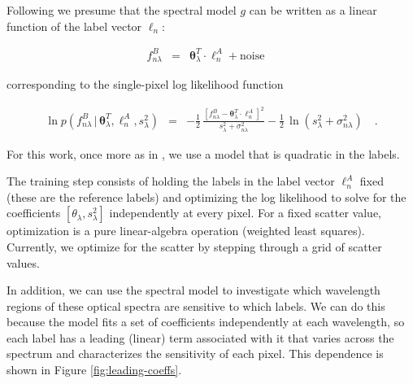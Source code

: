 \documentclass[12pt, preprint]{aastex}
\newcommand{\set}[1]{\bm{#1}}
\newcommand{\starlabel}{\ell}
\newcommand{\starlabelvec}{\set{\starlabel}}
\newcommand{\given}{\,|\,}
\begin{document}
Following \citet{Ness2015} we presume that the spectral model $g$ 
can be written as a linear function of the label vector $\starlabelvec_n$: 

\begin{eqnarray}
f_{n\lambda}^B &=&
\set{\theta}_\lambda^T \cdot \starlabelvec^A_n + \mbox{noise}
\label{eq:linearmodel}\quad
\end{eqnarray}

\noindent corresponding to the single-pixel log likelihood function

\begin{eqnarray}
\ln p(f_{n\lambda}^B\given\set{\theta}^T_\lambda, \starlabelvec^A_n, s_\lambda^2) &=&
 -\frac{1}{2}\,\frac{[f_{n\lambda}^B - \set{\theta}^T_\lambda \cdot \starlabelvec^A_n]^2}{s_\lambda^2 + \sigma_{n\lambda}^2}
 -\frac{1}{2}\,\ln(s_\lambda^2 + \sigma_{n\lambda}^2)
\label{eq:like}\quad.
\end{eqnarray}

\noindent For this work, once more as in \citet{Ness2015}, 
we use a model that is quadratic in the labels. 

The training step consists of holding the labels in the label vector 
$\starlabelvec^A_n$ fixed (these are the reference labels) 
and optimizing the log likelihood to solve for the coefficients 
$[\theta_\lambda, s_\lambda^2]$ independently at every pixel. 
For a fixed scatter value, optimization is a pure linear-algebra operation 
(weighted least squares). 
Currently, we optimize for the scatter by stepping through a 
grid of scatter values.

In addition, we can use the spectral model to investigate
which wavelength regions of these optical spectra
are sensitive to which labels. We can do this because
the model fits a set of coefficients independently
at each wavelength, so each label has a leading (linear)
term associated with it that varies across the spectrum
and characterizes the sensitivity of each pixel. 
This dependence is shown in Figure \ref{fig:leading-coeffs}.
\end{document}

